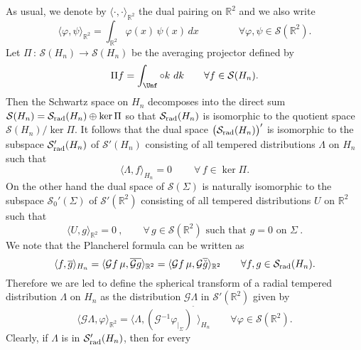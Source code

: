 \documentclass[12pt,a4paper]{amsart}
\theoremstyle{plain}
\theoremstyle{definition}
\numberwithin{equation}{section}
\begin{document}
As usual, we denote by ${\langle {\cdot},{\cdot} \rangle_{{\mathbb R}^2}}$   the dual  pairing on 
${\mathbb R}^2$   and we also write 
$$
{\langle {\varphi},{\psi} \rangle_{{\mathbb R}^2}}=\int_{{\mathbb R}^2} \varphi(x)\,\psi(x)\, dx\qquad \qquad
\forall \varphi,\psi\in {\mathcal S}({{\mathbb R}^2}).
$$  
Let $\Pi\, :\, {\mathcal S}({{H_{n}}}) \longrightarrow {\mathcal S}({{H_{n}}}) $ be the averaging projector  
defined by  
$$
\Pi f 
=\int _\Unf\circ k\,\,dk\qquad \forall f\in {\mathcal S}({{H_{n}}}).
$$
Then the Schwartz space on ${{H_{n}}}$ decomposes into the direct sum 
\hbox{${\mathcal S}({{H_{n}}})= {{\mathcal S}_{\text{\rm rad}}({{H_{n}}})} \oplus \ker \Pi$} so that  
$ {{\mathcal S}_{\text{\rm rad}}({{H_{n}}})} $  is isomorphic to the quotient space 
 ${\mathcal S}({{H_{n}}})/ \ker \Pi$. It follows that  
 the dual space  $ \big({{\mathcal S}_{\text{\rm rad}}({{H_{n}}})}\big)' $ is isomorphic    
 to the subspace ${{\mathcal S}'_{\text{\rm rad}}({{H_{n}}})}$ of ${\mathcal S}'({{H_{n}}})$
 consisting of all 
tempered distributions $\Lambda$  on ${{H_{n}}}$ such that
$$ 
{\langle { \Lambda},{ f} \rangle_{{H_{n}}}}=0\ \qquad\forall\,f\in\ker \Pi.
$$
 On the other hand the dual space of ${\mathcal S}({\Sigma})$ 
 is naturally isomorphic   to the subspace ${\mathcal S}_0'({\Sigma})$ of  ${\mathcal S}'({\mathbb R}^2)$ 
 consisting of all 
tempered distributions $U$  on ${\mathbb R}^2$ such that
\begin{equation*} 
{\langle { U},{ g} \rangle_{{\mathbb R}^2}}=0\ ,\qquad\forall\,g\in{\mathcal S}({\mathbb R}^2)\text{ such that }g=0\text{ on }{\Sigma}\ .
\end{equation*}
 We note that the Plancherel formula can be written as
$$
{\langle {f},{\overline g} \rangle_{{H_{n}}}}= {\langle {{\mathcal G} f\, \mu},{\overline{{\mathcal G} g}} \rangle_{{\mathbb R}^2}}
= {\langle {{\mathcal G} f\, \mu},{{{\mathcal G} \overline{\check g}}} \rangle_{{\mathbb R}^2}}
\qquad \forall f,g\in {{\mathcal S}_{\text{\rm rad}}({{H_{n}}})}.
$$  
Therefore we are led to define
the spherical transform of a radial  tempered distribution $\Lambda$ on ${{H_{n}}}$ as the 
distribution ${\mathcal G} \Lambda$ in ${\mathcal S}'({\mathbb R}^2)$ given  by 
\begin{equation}\label{tildeT}
{\langle {{\mathcal G} \Lambda},{\varphi} \rangle_{{\mathbb R}^2}}={\langle {\Lambda},{({\mathcal G}{^{-1}} {\varphi}_{|_\Sigma})^{\check{\phantom a}}} \rangle_{{H_{n}}}}
\qquad \forall {\varphi}\in {\mathcal S}({\mathbb R}^2). 
\end{equation}
Clearly, if $\Lambda$ is in ${{\mathcal S}'_{\text{\rm rad}}({{H_{n}}})}$, then for every 
\end{document}

